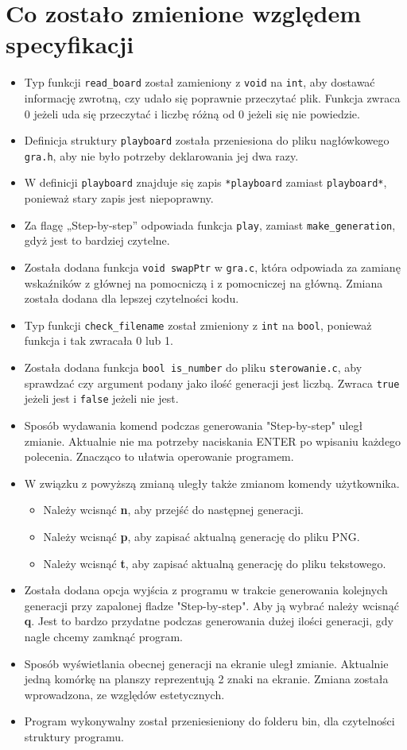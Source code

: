 \documentclass[12pt]{report}
\newcommand{\code}[1]{\texttt{#1}}
\begin{document}
\section{Co zostało zmienione względem specyfikacji}
\begin{itemize}
    \item Typ funkcji \code{read\_board} został zamieniony z \code{void} na \code{int}, aby dostawać informację zwrotną, czy udało się poprawnie przeczytać plik. Funkcja zwraca 0 jeżeli uda się przeczytać i liczbę różną od 0 jeżeli się nie powiedzie.
    \item Definicja struktury \code{playboard} została przeniesiona do pliku nagłówkowego \code{gra.h}, aby nie było potrzeby deklarowania jej dwa razy.
    \item W definicji \code{playboard} znajduje się zapis \code{*playboard} zamiast \code{playboard*}, ponieważ stary zapis jest niepoprawny.
    \item Za flagę „Step-by-step” odpowiada funkcja \code{play}, zamiast \code{make\_generation}, gdyż jest to bardziej czytelne.
    \item Została dodana funkcja \code{void swapPtr} w \code{gra.c}, która odpowiada za zamianę wskaźników z głównej na pomocniczą i z pomocniczej na główną. Zmiana została dodana dla lepszej czytelności kodu.
    \item Typ funkcji \code{check\_filename} został zmieniony z \code{int} na \code{bool}, ponieważ funkcja i tak zwracała 0 lub 1.
    \item Została dodana funkcja \code{bool is\_number} do pliku \code{sterowanie.c}, aby sprawdzać czy argument podany jako ilość generacji jest liczbą. Zwraca \code{true} jeżeli jest i \code{false} jeżeli nie jest.
    \item Sposób wydawania komend podczas generowania "Step-by-step" uległ zmianie. Aktualnie nie ma potrzeby naciskania ENTER po wpisaniu każdego polecenia. Znacząco to ułatwia operowanie programem.
    \item W związku z powyższą zmianą uległy także zmianom komendy użytkownika.
    \begin{itemize}
        \item Należy wcisnąć \textbf{n}, aby przejść do następnej generacji.
        \item Należy wcisnąć \textbf{p}, aby zapisać aktualną generację do pliku PNG.
        \item Należy wcisnąć \textbf{t}, aby zapisać aktualną generację do pliku tekstowego. 
    \end{itemize}
    \item Została dodana opcja wyjścia z programu w trakcie generowania kolejnych generacji przy zapalonej fladze "Step-by-step". Aby ją wybrać należy wcisnąć \textbf{q}. Jest to bardzo przydatne podczas generowania dużej ilości generacji, gdy nagle chcemy zamknąć program.
    \item Sposób wyświetlania obecnej generacji na ekranie uległ zmianie. Aktualnie jedną komórkę na planszy reprezentują 2 znaki na ekranie. Zmiana została wprowadzona, ze względów estetycznych.
    \item Program wykonywalny został przeniesieniony do folderu bin, dla czytelności struktury programu.


\end{itemize}
\end{document}
